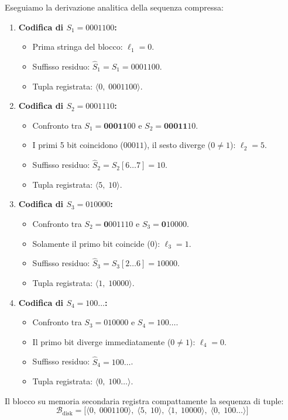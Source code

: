 Eseguiamo la derivazione analitica della sequenza compressa:
\begin{enumerate}
  \item \textbf{Codifica di $S_1 = 0001100$:}
  \begin{itemize}
    \item Prima stringa del blocco: $\ell_1 = 0$.
    \item Suffisso residuo: $\hat{S}_1 = S_1 = 0001100$.
    \item Tupla registrata: $\langle 0, \; 0001100 \rangle$.
  \end{itemize}
  \item \textbf{Codifica di $S_2 = 0001110$:}
  \begin{itemize}
    \item Confronto tra $S_1 = \mathbf{00011}00$ e $S_2 = \mathbf{00011}10$.
    \item I primi 5 bit coincidono ($00011$), il sesto diverge ($0 \neq 1$): $\ell_2 = 5$.
    \item Suffisso residuo: $\hat{S}_2 = S_2[6 \dots 7] = 10$.
    \item Tupla registrata: $\langle 5, \; 10 \rangle$.
  \end{itemize}
  \item \textbf{Codifica di $S_3 = 010000$:}
  \begin{itemize}
    \item Confronto tra $S_2 = \mathbf{0}001110$ e $S_3 = \mathbf{0}10000$.
    \item Solamente il primo bit coincide ($0$): $\ell_3 = 1$.
    \item Suffisso residuo: $\hat{S}_3 = S_3[2 \dots 6] = 10000$.
    \item Tupla registrata: $\langle 1, \; 10000 \rangle$.
  \end{itemize}
  \item \textbf{Codifica di $S_4 = 100\dots$:}
  \begin{itemize}
    \item Confronto tra $S_3 = 010000$ e $S_4 = 100\dots$.
    \item Il primo bit diverge immediatamente ($0 \neq 1$): $\ell_4 = 0$.
    \item Suffisso residuo: $\hat{S}_4 = 100\dots$.
    \item Tupla registrata: $\langle 0, \; 100\dots \rangle$.
  \end{itemize}
\end{enumerate}

Il blocco su memoria secondaria registra compattamente la sequenza di tuple:
\begin{equation}
  \mathcal{B}_{\text{disk}} = \Big[ \langle 0, \; 0001100 \rangle, \; \langle 5, \; 10 \rangle, \; \langle 1, \; 10000 \rangle, \; \langle 0, \; 100\dots \rangle \Big]
\end{equation}

